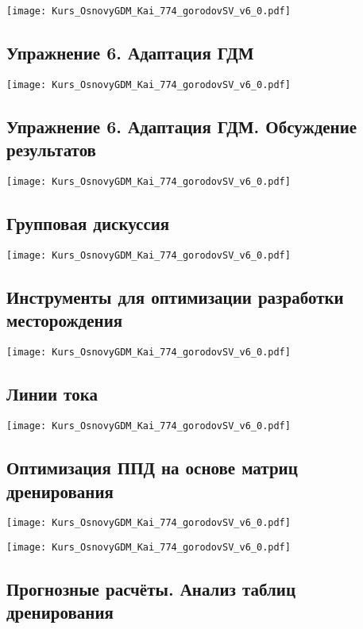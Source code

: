 \documentclass[main.tex]{subfiles}
\begin{document}
\texttt{[image: Kurs\_OsnovyGDM\_Kai\_774\_gorodovSV\_v6\_0.pdf]}

\subsection{Упражнение 6. Адаптация ГДМ}

\texttt{[image: Kurs\_OsnovyGDM\_Kai\_774\_gorodovSV\_v6\_0.pdf]}

\subsection{Упражнение 6. Адаптация ГДМ. Обсуждение результатов}

\texttt{[image: Kurs\_OsnovyGDM\_Kai\_774\_gorodovSV\_v6\_0.pdf]}

\subsection{Групповая дискуссия}

\texttt{[image: Kurs\_OsnovyGDM\_Kai\_774\_gorodovSV\_v6\_0.pdf]}

\subsection{Инструменты для оптимизации разработки месторождения}

\texttt{[image: Kurs\_OsnovyGDM\_Kai\_774\_gorodovSV\_v6\_0.pdf]}

\subsection{Линии тока}

\texttt{[image: Kurs\_OsnovyGDM\_Kai\_774\_gorodovSV\_v6\_0.pdf]}

\subsection{Оптимизация ППД на основе матриц дренирования}

\texttt{[image: Kurs\_OsnovyGDM\_Kai\_774\_gorodovSV\_v6\_0.pdf]}

\texttt{[image: Kurs\_OsnovyGDM\_Kai\_774\_gorodovSV\_v6\_0.pdf]}

\subsection{Прогнозные расчёты. Анализ таблиц дренирования}
\end{document}
